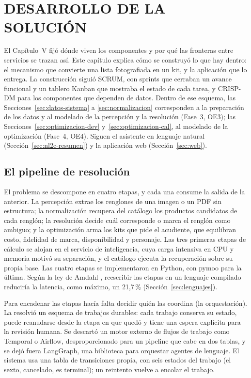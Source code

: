 \setcounter{subsection}{0}
\section{DESARROLLO DE LA SOLUCIÓN}
\label{cap:desarrolloSolucion}

El Capítulo~V fijó dónde viven los componentes y por qué las fronteras entre servicios se
trazan así. Este capítulo explica cómo se construyó lo que hay dentro: el
mecanismo que convierte una lista fotografiada en un kit, y la aplicación que lo entrega. La construcción siguió SCRUM, con sprints que cerraban un avance funcional y un tablero
Kanban que mostraba el estado de cada tarea, y CRISP-DM \citep{chapman_crisp-dm_2000} para los
componentes que dependen de datos. Dentro de ese esquema, las Secciones~\ref{sec:datos-sistema} a
\ref{sec:normalizacion} corresponden a la preparación de los datos y al modelado de la percepción y
la resolución (Fase~3, OE3); las Secciones~\ref{sec:optimizacion-dev} y~\ref{sec:optimizacion-cal}, al modelado de la
optimización (Fase~4, OE4). Siguen el asistente en lenguaje natural
(Sección~\ref{sec:nl2c-resumen}) y la aplicación web (Sección~\ref{sec:web}).

\subsection{El pipeline de resolución}
\label{sec:pipeline}

El problema se descompone en cuatro etapas, y cada una consume la salida de la anterior. La
percepción extrae los renglones de una imagen o un PDF sin estructura; la normalización recupera del
catálogo los productos candidatos de cada renglón; la resolución decide cuál corresponde o marca el
renglón como ambiguo; y la optimización arma los kits que pide el acudiente, que equilibran costo,
fidelidad de marca, disponibilidad y personaje. Las tres primeras etapas de cálculo se alojan en el
servicio de inteligencia, cuya carga intensiva en CPU y memoria motivó su separación, y el catálogo
ejecuta la recuperación sobre su propia base. Las cuatro etapas se implementaron en Python, con
pymoo \citep{blank_pymoo_2020} para la última. Según la ley de
Amdahl \citep{amdahl_validity_1967}, reescribir las etapas en un lenguaje compilado reduciría la latencia, como máximo, un 21,7\,\% (Sección~\ref{sec:lenguajes}).

Para encadenar las etapas hacía falta decidir quién las coordina (la orquestación). La resolvió
un esquema de trabajos durables: cada trabajo conserva su
estado, puede reanudarse desde la etapa en que quedó y tiene una espera explícita para la revisión
humana. Se descartó un motor externo de flujos de trabajo como Temporal o Airflow, desproporcionado
para un pipeline que cabe en dos tablas, y se dejó fuera LangGraph, una biblioteca para orquestar
agentes de lenguaje. El sistema usa una tabla de transiciones propia, con seis estados del trabajo
(el sexto, cancelado, es terminal); un reintento vuelve a encolar el trabajo.

